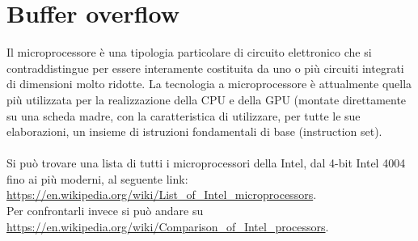 \documentclass[8pt]{extarticle}
\begin{document}
\section{Buffer overflow}
Il microprocessore è una tipologia particolare di circuito elettronico che si contraddistingue per 
essere interamente costituita da uno o più circuiti integrati di dimensioni molto ridotte. 
La tecnologia a microprocessore è attualmente quella più utilizzata per la realizzazione della CPU e 
della GPU (montate direttamente su una scheda madre, con la caratteristica di utilizzare, per tutte 
le sue elaborazioni, un insieme di istruzioni fondamentali di base (instruction set).\\\\
Si può trovare una lista di tutti i microprocessori della Intel, dal 4-bit Intel 4004 fino ai più 
moderni, al seguente link: \url{https://en.wikipedia.org/wiki/List_of_Intel_microprocessors}. \\
Per confrontarli invece si può andare su \url{https://en.wikipedia.org/wiki/Comparison_of_Intel_processors}.
\pagebreak
\end{document}
